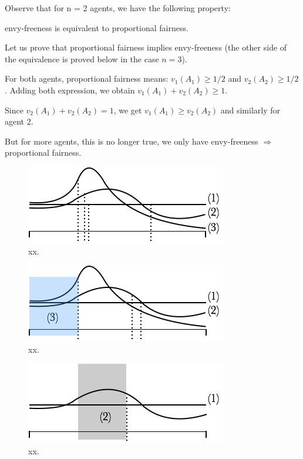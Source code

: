 
\bigskip

Observe that for n = 2 agents, we have the following property:

\begin{prop}
envy-freeness is equivalent to proportional fairness.
\end{prop}

Let us prove that proportional fairness implies envy-freeness (the other side of the equivalence is proved below in the case $n=3$).

For both agents, proportional fairness means: $v_1(A_1) \geq 1/2$ and $v_2(A_2) \geq 1/2$.
Adding both expression, we obtain $v_1(A_1)+v_2(A_2) \geq 1$.

Since $v_2(A_1) + v_2(A_2) = 1$, we get 
$v_1(A_1) \geq v_2(A_2)$ and similarly for agent 2. 
\bigskip

But for more agents, this is no longer true, we only have envy-freeness $\Rightarrow$ proportional fairness.
\begin{figure}[htb]
\begin{center}
        \includegraphics[scale=0.6]{FiguresMaths/CakeEnvyFree1}
        \caption{xx.}
        \label{Fig:cakeEnvyFree1}
\end{center}
\end{figure}
\begin{figure}[htb]
\begin{center}
        \includegraphics[scale=0.6]{FiguresMaths/CakeEnvyFree2}
        \caption{xx.}
        \label{Fig:cakeEnvyFree2}
\end{center}
\end{figure}
\begin{figure}[htb]
\begin{center}
        \includegraphics[scale=0.6]{FiguresMaths/CakeEnvyFree3}
        \caption{xx.}
        \label{Fig:cakeEnvyFree3}
\end{center}
\end{figure}

